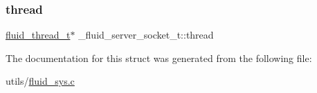 \subsubsection{\texorpdfstring{thread}{thread}}
{\footnotesize\ttfamily \hyperlink{fluid__sys_8h_a60a6466e68a45b0f0709f1ebaa7e6f85}{fluid\+\_\+thread\+\_\+t}$\ast$ \+\_\+fluid\+\_\+server\+\_\+socket\+\_\+t\+::thread}



The documentation for this struct was generated from the following file\+:\begin{DoxyCompactItemize}
\item 
utils/\hyperlink{fluid__sys_8c}{fluid\+\_\+sys.\+c}\end{DoxyCompactItemize}

